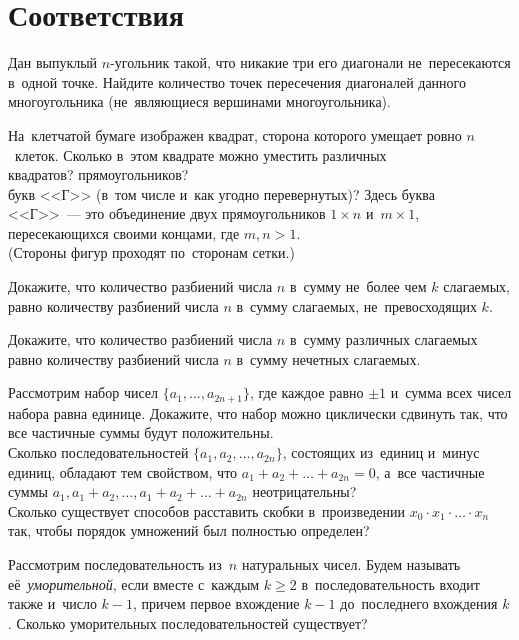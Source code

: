 
\section*{Соответствия}


\begin{problems}

\item
Дан выпуклый $n$-угольник такой, что никакие три его диагонали не~пересекаются
в~одной точке.
Найдите количество точек пересечения диагоналей данного многоугольника
(не~являющиеся вершинами многоугольника).

\item
На~клетчатой бумаге изображен квадрат, сторона которого умещает ровно
$n$~клеток.
Сколько в~этом квадрате можно уместить различных
\\
\sp квадратов?
\qquad
\sp прямоугольников?
\\
\sp
букв <<Г>> (в~том числе и~как угодно перевернутых)?
Здесь буква <<Г>>~--- это объединение двух прямоугольников
$1 \times n$ и~$m \times 1$, пересекающихся своими концами, где $m, n > 1$.
\\
(Стороны фигур проходят по~сторонам сетки.)

\item
Докажите, что количество разбиений числа $n$ в~сумму не~более чем
$k$ слагаемых, равно количеству разбиений числа $n$ в~сумму слагаемых,
не~превосходящих $k$.

\item
Докажите, что количество разбиений числа $n$ в~сумму различных слагаемых равно
количеству разбиений числа $n$ в~сумму нечетных слагаемых.

\item
\sp
Рассмотрим набор чисел $\{a_1, \ldots, a_{2n + 1}\}$, где каждое равно
$\pm 1$ и~сумма всех чисел набора равна единице.
Докажите, что набор можно циклически сдвинуть так, что все частичные суммы
будут положительны.
\\
\sp
Сколько последовательностей  $\{a_1, a_2, \ldots , a_{2n}\}$, состоящих
из~единиц и~минус единиц, обладают тем свойством, что 
$a_1 + a_2 + \ldots + a_{2n} = 0$,  а~все частичные суммы
$a_1,  a_1 + a_2, \ldots,  a_1 + a_2 + \ldots + a_{2n}$ неотрицательны?
\\
\sp
Сколько существует способов расставить скобки в~произведении
$x_0 \cdot x_1 \cdot \ldots \cdot x_n$ так, чтобы порядок умножений был
полностью определен?

\item
Рассмотрим последовательность из~$n$ натуральных чисел.
Будем называть её~\emph{уморительной}, если вместе с~каждым $k \geqslant 2$
в~последовательность входит также и~число $k - 1$, причем первое вхождение
$k - 1$ до~последнего вхождения $k$.
Сколько уморительных последовательностей существует?

\end{problems}

